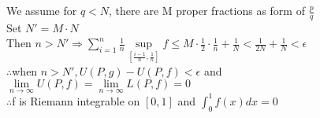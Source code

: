 \documentclass{article}
\begin{document}
We assume for $q<N$, there are M proper fractions as form of $\displaystyle\frac{p}{q}$\\

Set $N'=M\cdot N$\\

Then $\displaystyle n>N'\Rightarrow\sum \limits_{i=1}^n\frac{1}{n}\sup \limits_{[\frac{i-1}{n},\frac{1}{n}]}f\leq M\cdot\frac{1}{2}\cdot\frac{1}{n}+\frac{1}{N}<\frac{1}{2N}+\frac{1}{N}<\epsilon$\\

$\therefore$\qquad when $n>N', U(P,g)-U(P,f)<\epsilon$ and $\lim \limits_{n \to \infty}U(P,f)=\lim \limits_{n \to \infty}L(P,f)=0$\\

$\therefore$\qquad f is Riemann integrable on $[0,1]$ and $\int_0^1f(x)dx=0$\\
\end{document}
